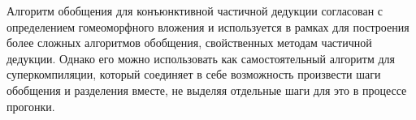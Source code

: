 Алгоритм обобщения для конъюнктивной частичной дедукции согласован с
определением гомеоморфного вложения
и используется в рамках \forcpd для построения более сложных алгоритмов обобщения,
свойственных методам частичной дедукции.
Однако его можно использовать как самостоятельный алгоритм для
суперкомпиляции, который соединяет в себе возможность произвести шаги обобщения
и разделения вместе, не выделяя отдельные шаги для это в процессе прогонки.
